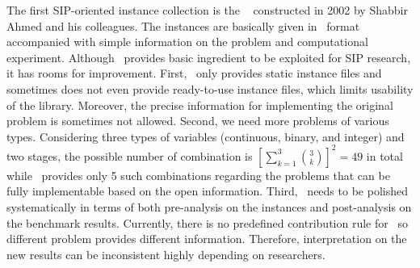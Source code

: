 The first SIP-oriented instance collection is the \siplib\ \cite{web:SIPLIB1} constructed in 2002 by Shabbir Ahmed and his colleagues. The instances are basically given in \smps\ format accompanied with simple information on the problem and computational experiment. Although \siplib\ provides basic ingredient to be exploited for SIP research, it has rooms for improvement. First, \siplib\ only provides static instance files and sometimes does not even provide ready-to-use instance files, which limits usability of the library. Moreover, the precise information for implementing the original problem is sometimes not allowed. Second, we need more problems of various types. Considering three types of variables (continuous, binary, and integer) and two stages, the possible number of combination is $\left[\sum_{k=1}^3\binom{3}{k}\right]^2=49$ in total while \siplib\ provides only 5 such combinations regarding the problems that can be fully implementable based on the open information.
Third, \siplib\ needs to be polished systematically in terms of both pre-analysis on the instances and post-analysis on the benchmark results. Currently, there is no predefined contribution rule for \siplib\ so different problem provides different information. Therefore, interpretation on the new results can be inconsistent highly depending on researchers.



